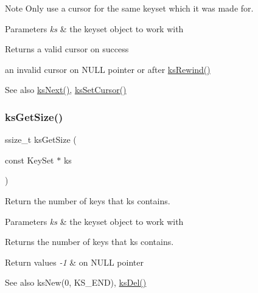 \begin{DoxyNote}{Note}
Only use a cursor for the same keyset which it was made for.
\end{DoxyNote}

\begin{DoxyParams}{Parameters}
{\em ks} & the keyset object to work with \\
\hline
\end{DoxyParams}
\begin{DoxyReturn}{Returns}
a valid cursor on success 

an invalid cursor on N\+U\+LL pointer or after \hyperlink{group__keyset_gabe793ff51f1728e3429c84a8a9086b70}{ks\+Rewind()} 
\end{DoxyReturn}
\begin{DoxySeeAlso}{See also}
\hyperlink{group__keyset_ga317321c9065b5a4b3e33fe1c399bcec9}{ks\+Next()}, \hyperlink{group__keyset_gad94c9ffaa3e8034564c0712fd407c345}{ks\+Set\+Cursor()} 
\end{DoxySeeAlso}
\mbox{\label{group__keyset_ga7474ad6b0a0fa969dbdf267ba5770eee}} 
\subsubsection{\texorpdfstring{ks\+Get\+Size()}{ksGetSize()}}
{\footnotesize\ttfamily ssize\+\_\+t ks\+Get\+Size (\begin{DoxyParamCaption}\item[{const Key\+Set $\ast$}]{ks }\end{DoxyParamCaption})}



Return the number of keys that {\ttfamily ks} contains. 


\begin{DoxyParams}{Parameters}
{\em ks} & the keyset object to work with \\
\hline
\end{DoxyParams}
\begin{DoxyReturn}{Returns}
the number of keys that {\ttfamily ks} contains. 
\end{DoxyReturn}

\begin{DoxyRetVals}{Return values}
{\em -\/1} & on N\+U\+LL pointer \\
\hline
\end{DoxyRetVals}
\begin{DoxySeeAlso}{See also}
ks\+New(0, K\+S\+\_\+\+E\+N\+D), \hyperlink{group__keyset_ga27e5c16473b02a422238c8d970db7ac8}{ks\+Del()} 
\end{DoxySeeAlso}
\mbox{\label{group__keyset_gae7dbf3aef70e67b5328475eb3d1f92f5}} 
